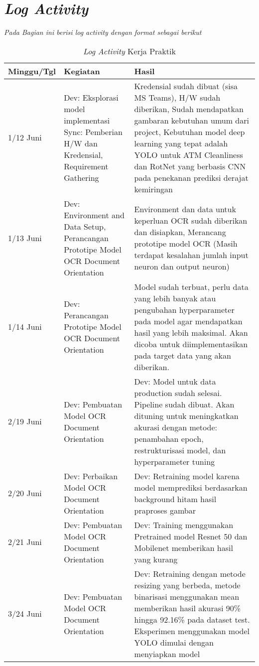\chapter{\textit{Log Activity}}
\textit{Pada Bagian ini berisi log activity dengan format sebagai berikut}
    \begin{longtable}{|p{5em}|p{10em}|p{15em}|}
    \caption{\textit{Log Activity} Kerja Praktik}\\
    \hline
        \centering Minggu/Tgl & \centering Kegiatan & \centering Hasil \tabularnewline \hline
        1/12 Juni & Dev: Eksplorasi model implementasi \newline 
Sync: Pemberian H/W dan Kredensial, Requirement Gathering & Kredensial sudah dibuat (sisa MS Teams), H/W sudah diberikan, Sudah mendapatkan gambaran kebutuhan umum dari project, Kebutuhan model deep learning yang tepat adalah YOLO untuk ATM Cleanliness dan RotNet yang berbasis CNN pada penekanan prediksi derajat kemiringan  \\ \hline
        1/13 Juni & Dev: Environment and Data Setup, Perancangan Prototipe Model OCR Document Orientation & Environment dan data untuk keperluan OCR sudah diberikan dan disiapkan, Merancang prototipe model OCR (Masih terdapat kesalahan jumlah input neuron dan output neuron) \\ \hline
        1/14 Juni & Dev: Perancangan Prototipe Model OCR Document Orientation & Model sudah terbuat, perlu data yang lebih banyak atau pengubahan hyperparameter pada model agar mendapatkan hasil yang lebih maksimal. Akan dicoba untuk diimplementasikan pada target data yang akan diberikan. \\ \hline
        2/19 Juni & Dev: Pembuatan Model OCR Document Orientation & Dev: Model untuk data production sudah selesai. Pipeline sudah dibuat. Akan dituning untuk meningkatkan akurasi dengan metode: penambahan epoch, restrukturisasi model, dan hyperparameter tuning \\ \hline
        2/20 Juni & Dev: Perbaikan Model OCR Document Orientation & Dev: Retraining model karena model memprediksi berdasarkan background hitam hasil praproses gambar \\ \hline
        2/21 Juni & Dev: Pembuatan Model OCR Document Orientation & Dev: Training menggunakan Pretrained model Resnet 50 dan Mobilenet memberikan hasil yang kurang \\ \hline
        3/24 Juni & Dev: Pembuatan Model OCR Document Orientation & Dev: Retraining dengan metode resizing yang berbeda, metode binarisasi menggunakan mean memberikan hasil akurasi 90\% hingga 92.16\% pada dataset test. Eksperimen menggunakan model YOLO dimulai dengan menyiapkan model \\ \hline

\end{longtable}

